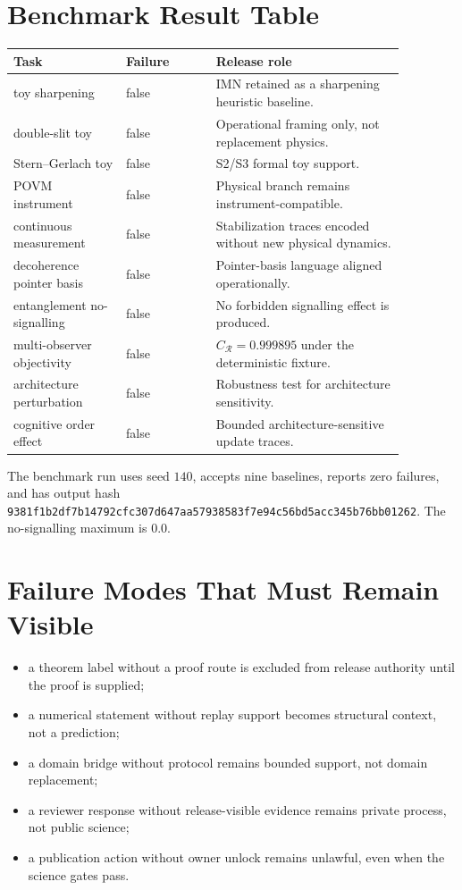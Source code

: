 \documentclass[11pt,a4paper]{article}
\begin{document}
\section*{Benchmark Result Table}
\begin{longtable}{>{\raggedright\arraybackslash}p{0.25\linewidth}>{\raggedright\arraybackslash}p{0.20\linewidth}>{\raggedright\arraybackslash}p{0.42\linewidth}}
\textbf{Task} & \textbf{Failure} & \textbf{Release role}\\
\hline
toy sharpening & false & IMN retained as a sharpening heuristic baseline.\\
double-slit toy & false & Operational framing only, not replacement physics.\\
Stern--Gerlach toy & false & S2/S3 formal toy support.\\
POVM instrument & false & Physical branch remains instrument-compatible.\\
continuous measurement & false & Stabilization traces encoded without new physical dynamics.\\
decoherence pointer basis & false & Pointer-basis language aligned operationally.\\
entanglement no-signalling & false & No forbidden signalling effect is produced.\\
multi-observer objectivity & false & $C_{\mathcal{R}}=0.999895$ under the deterministic fixture.\\
architecture perturbation & false & Robustness test for architecture sensitivity.\\
cognitive order effect & false & Bounded architecture-sensitive update traces.\\
\end{longtable}
The benchmark run uses seed $140$, accepts nine baselines, reports zero failures, and has output hash \texttt{9381f1b2df7b14792cfc307d647aa57938583f7e94c56bd5acc345b76bb01262}. The no-signalling maximum is $0.0$.

\section*{Failure Modes That Must Remain Visible}
\begin{itemize}
  \item a theorem label without a proof route is excluded from release authority until the proof is supplied;
  \item a numerical statement without replay support becomes structural context, not a prediction;
  \item a domain bridge without protocol remains bounded support, not domain replacement;
  \item a reviewer response without release-visible evidence remains private process, not public science;
  \item a publication action without owner unlock remains unlawful, even when the science gates pass.
\end{itemize}
\end{document}
